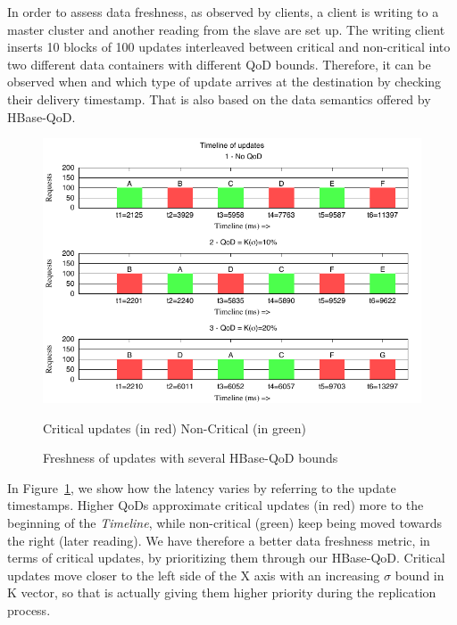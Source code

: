 
In order to assess data freshness, as observed by clients, a client is writing to a master cluster and another reading from the slave are set up. The writing client inserts 10 blocks of 100 updates interleaved between critical and non-critical into two different data containers with different QoD bounds. Therefore, it can be observed when and which type of update arrives at the destination by checking their delivery timestamp. That is also based on the data semantics offered by HBase-QoD.

\begin{figure}[b]
\centering
\includegraphics[scale=1.3]{figs/freshness-latest.pdf}
\caption{Freshness of updates with several HBase-QoD bounds}
\label{fig-freshness-letters}
Critical updates (in red)
Non-Critical (in green)
\end{figure}

In Figure~\ref{fig-freshness-letters}, we show how the latency varies by referring to the update timestamps. Higher QoDs approximate critical updates (in red) more to the beginning of the \emph{Timeline}, while non-critical (green) keep being moved towards the right (later reading). We have therefore a better data freshness metric, in terms of critical updates, by prioritizing them through our HBase-QoD. Critical updates move closer to the left side of the X axis with an increasing $\sigma$ bound in K vector, so that is actually giving them higher priority during the replication process.

